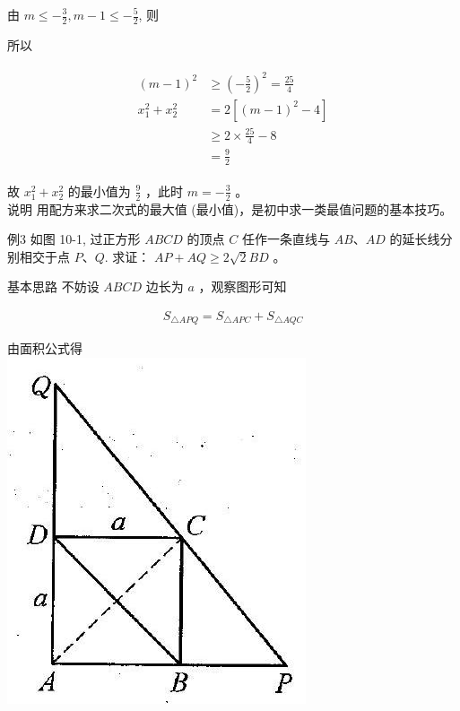 \documentclass[10pt]{article}
\begin{document}
由 $m \leqslant-\frac{3}{2}, m-1 \leqslant-\frac{5}{2}$, 则

所以

\begin{align*}
\begin{aligned}
(m-1)^{2} & \geqslant\left(-\frac{5}{2}\right)^{2}=\frac{25}{4} \\
x_{1}^{2}+x_{2}^{2} & =2\left[(m-1)^{2}-4\right] \\
& \geqslant 2 \times \frac{25}{4}-8 \\
& =\frac{9}{2}
\end{aligned}
\end{align*}

故 $x_{1}^{2}+x_{2}^{2}$ 的最小值为 $\frac{9}{2}$ ，此时 $m=-\frac{3}{2}$ 。\\
说明 用配方来求二次式的最大值 (最小值)，是初中求一类最值问题的基本技巧。

例3 如图 10-1, 过正方形 $A B C D$ 的顶点 $C$ 任作一条直线与 $A B 、 A D$ 的延长线分别相交于点 $P 、 Q$. 求证： $A P+A Q \geqslant 2 \sqrt{2} B D$ 。

基本思路 不妨设 $A B C D$ 边长为 $a$ ，观察图形可知

\begin{align*}
S_{\triangle A P Q}=S_{\triangle A P C}+S_{\triangle A Q C}
\end{align*}

由面积公式得\\
\includegraphics[max width=\textwidth, center]{2024_10_30_26b590fd1106d28139f0g-063}
\end{document}
